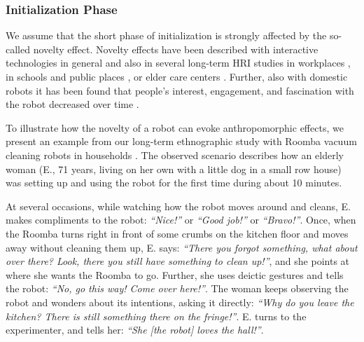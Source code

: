 \documentclass{frontiersSCNS} %
\begin{document}
\subsubsection{Initialization Phase\\}
\label{sec:initialization}


We assume that the short phase of initialization is strongly affected by the
so-called novelty effect.  Novelty effects have been described with interactive
technologies in general \citep{rogers_diffusion_1995} and also in several
long-term HRI studies in workplaces
\citep{huttenrauch_fetch-and-carry_2003,mutlu_robots_2008}, in schools and
public places
\citep{gockley_designing_2005,kanda_interactive_2004,kanda_communication_2005},
or elder care centers \citep{sabelli_conversational_2011}. Further, also with
domestic robots it has been found that people's interest, engagement, and
fascination with the robot decreased over time
\citep{fink_living_2013,fernaeus_how_2010,sung_robots_2009}.

To illustrate how the novelty of a robot can evoke anthropomorphic effects, we
present an example from our long-term ethnographic study with Roomba vacuum
cleaning robots in households \citep{fink_living_2013}. The observed scenario
describes how an elderly woman (E., 71 years, living on her own with a little
dog in a small row house) was setting up and using the robot for the first time
during about 10 minutes.

At several occasions, while watching how the robot moves around and cleans, E.
makes compliments to the robot: \emph{``Nice!''} or \emph{``Good job!''} or
\emph{``Bravo!''}. Once, when the Roomba turns right in front of some crumbs on
the kitchen floor and moves away without cleaning them up, E. says:
\emph{``There you forgot something, what about over there? Look, there you still
have something to clean up!''}, and she points at where she wants the Roomba to
go. Further, she uses deictic gestures and tells the robot: \emph{``No, go this
way! Come over here!''}. The woman keeps observing the robot and wonders about
its intentions, asking it directly: \emph{``Why do you leave the kitchen? There
is still something there on the fringe!''}. E. turns to the experimenter, and
tells her: \emph{``She [the robot] loves the hall!''}.
\end{document}
